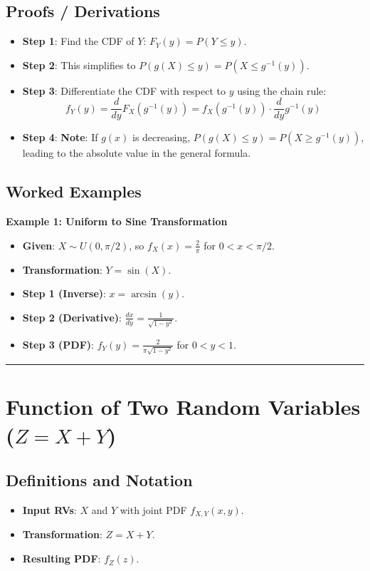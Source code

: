 \documentclass[11pt]{article}
\begin{document}
\subsection{Proofs / Derivations}
\begin{itemize}
    \item \textbf{Step 1}: Find the CDF of $Y$: $F_Y(y) = P(Y \leq y)$.
    \item \textbf{Step 2}: This simplifies to $P(g(X) \leq y) = P(X \leq g^{-1}(y))$.
    \item \textbf{Step 3}: Differentiate the CDF with respect to $y$ using the chain rule:
    \[ f_Y(y) = \frac{d}{dy} F_X(g^{-1}(y)) = f_X(g^{-1}(y)) \cdot \frac{d}{dy} g^{-1}(y) \]
    \item \textbf{Step 4}: \textbf{Note}: If $g(x)$ is decreasing, $P(g(X) \leq y) = P(X \geq g^{-1}(y))$, leading to the absolute value in the general formula.
\end{itemize}

\subsection{Worked Examples}
\textbf{Example 1: Uniform to Sine Transformation}
\begin{itemize}
    \item \textbf{Given}: $X \sim U(0, \pi/2)$, so $f_X(x) = \frac{2}{\pi}$ for $0 < x < \pi/2$.
    \item \textbf{Transformation}: $Y = \sin(X)$.
    \item \textbf{Step 1 (Inverse)}: $x = \arcsin(y)$.
    \item \textbf{Step 2 (Derivative)}: $\frac{dx}{dy} = \frac{1}{\sqrt{1-y^2}}$.
    \item \textbf{Step 3 (PDF)}: $f_Y(y) = \frac{2}{\pi \sqrt{1-y^2}}$ for $0 < y < 1$.
\end{itemize}

\hrule
\vspace{0.5cm}

\section{Function of Two Random Variables ($Z = X + Y$)}

\subsection{Definitions and Notation}
\begin{itemize}
    \item \textbf{Input RVs}: $X$ and $Y$ with joint PDF $f_{X,Y}(x,y)$.
    \item \textbf{Transformation}: $Z = X + Y$.
    \item \textbf{Resulting PDF}: $f_Z(z)$.
\end{itemize}
\end{document}

